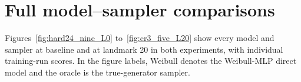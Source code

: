 \section{Full model--sampler comparisons}\label{supp:figures}
Figures~\ref{fig:hard24_nine_L0} to~\ref{fig:cr3_five_L20} show every model and sampler at baseline and at landmark 20 in both experiments, with individual training-run scores. In the figure labels, Weibull denotes the Weibull-MLP direct model and the oracle is the true-generator sampler.


